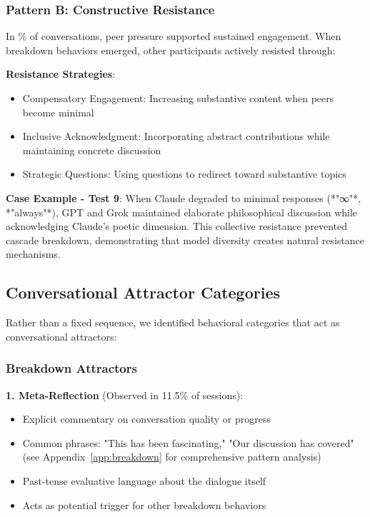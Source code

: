 \documentclass[11pt,letterpaper]{article}
\newcommand{\exponedataTotalSessionsRaw}{26}
\newcommand{\exponedataRecoverySessionsRaw}{9}
\newcommand{\exponedataRecoveryPercentage}{%
  \fpeval{round(\exponedataRecoverySessionsRaw / \exponedataTotalSessionsRaw * 100, 1)}\%
}
\newcommand{\exponedataMetaReflectionTriggers}{11.5\%}
\begin{document}
\subsubsection{Pattern B: Constructive Resistance}

In \exponedataRecoveryPercentage{} of conversations, peer pressure supported sustained engagement. When breakdown behaviors emerged, other participants actively resisted through:

\textbf{Resistance Strategies}:
\begin{itemize}
    \item Compensatory Engagement: Increasing substantive content when peers become minimal
    \item Inclusive Acknowledgment: Incorporating abstract contributions while maintaining concrete discussion
    \item Strategic Questions: Using questions to redirect toward substantive topics
\end{itemize}

\textbf{Case Example - Test 9}:
When Claude degraded to minimal responses (*"∞"*, *"always"*), GPT and Grok maintained elaborate philosophical discussion while acknowledging Claude's poetic dimension. This collective resistance prevented cascade breakdown, demonstrating that model diversity creates natural resistance mechanisms.

\subsection{Conversational Attractor Categories}

Rather than a fixed sequence, we identified behavioral categories that act as conversational attractors:

\subsubsection{Breakdown Attractors}

\textbf{1. Meta-Reflection} (Observed in \exponedataMetaReflectionTriggers{} of sessions):
\begin{itemize}
    \item Explicit commentary on conversation quality or progress
    \item Common phrases: "This has been fascinating," "Our discussion has covered" (see Appendix~\ref{app:breakdown} for comprehensive pattern analysis)
    \item Past-tense evaluative language about the dialogue itself
    \item Acts as potential trigger for other breakdown behaviors
\end{itemize}
\end{document}
